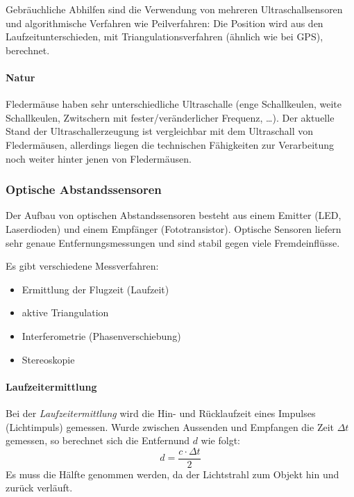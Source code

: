 					Gebräuchliche Abhilfen sind die Verwendung von mehreren Ultraschallsensoren und algorithmische Verfahren wie Peilverfahren: Die Position wird aus den Laufzeitunterschieden, \zB mit Triangulationsverfahren (ähnlich wie bei GPS), berechnet.

				\paragraph{Natur}
					Fledermäuse haben sehr unterschiedliche Ultraschalle (enge Schallkeulen, weite Schallkeulen, Zwitschern mit fester/veränderlicher Frequenz, \dots). Der aktuelle Stand der Ultraschallerzeugung ist vergleichbar mit dem Ultraschall von Fledermäusen, allerdings liegen die technischen Fähigkeiten zur Verarbeitung noch weiter hinter jenen von Fledermäusen.

			\subsubsection{Optische Abstandssensoren}
				Der Aufbau von optischen Abstandssensoren besteht aus einem Emitter (LED, Laserdioden) und einem Empfänger (Fototransistor). Optische Sensoren liefern sehr genaue Entfernungsmessungen und sind stabil gegen viele Fremdeinflüsse.
				
				Es gibt verschiedene Messverfahren:
				\begin{itemize}
					\item Ermittlung der Flugzeit (Laufzeit)
					\item aktive Triangulation
					\item Interferometrie (Phasenverschiebung)
					\item Stereoskopie
				\end{itemize}

				\paragraph{Laufzeitermittlung}
					Bei der \emph{Laufzeitermittlung} wird die Hin- und Rücklaufzeit eines Impulses (\zB Lichtimpuls) gemessen. Wurde zwischen Aussenden und Empfangen die Zeit \( \Delta t \) gemessen, so berechnet sich die Entfernund \(d\) wie folgt:
					\begin{equation*}
						d = \frac{c \cdot \Delta t}{2}
					\end{equation*}
					Es muss die Hälfte genommen werden, da der Lichtstrahl zum Objekt hin und zurück verläuft.
					
